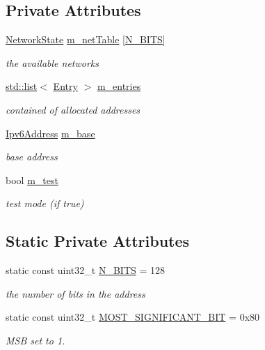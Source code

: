 \subsection*{Private Attributes}
\begin{DoxyCompactItemize}
\item 
\hyperlink{classns3_1_1Ipv6AddressGeneratorImpl_1_1NetworkState}{Network\+State} \hyperlink{classns3_1_1Ipv6AddressGeneratorImpl_a4b742848bb716936009880a429664323}{m\+\_\+net\+Table} \mbox{[}\hyperlink{classns3_1_1Ipv6AddressGeneratorImpl_abe99ce1055f3a7de9263da1d34ef2629}{N\+\_\+\+B\+I\+TS}\mbox{]}
\begin{DoxyCompactList}\small\item\em the available networks \end{DoxyCompactList}\item 
\hyperlink{openflow-interface_8h_afd9bcfa176617760671b67580f536fa7}{std\+::list}$<$ \hyperlink{classns3_1_1Ipv6AddressGeneratorImpl_1_1Entry}{Entry} $>$ \hyperlink{classns3_1_1Ipv6AddressGeneratorImpl_ab7b8cc4871178edafc571d7a9449fef1}{m\+\_\+entries}
\begin{DoxyCompactList}\small\item\em contained of allocated addresses \end{DoxyCompactList}\item 
\hyperlink{classns3_1_1Ipv6Address}{Ipv6\+Address} \hyperlink{classns3_1_1Ipv6AddressGeneratorImpl_a1e53eb1183330c04ef0a0d81e3a3c21e}{m\+\_\+base}
\begin{DoxyCompactList}\small\item\em base address \end{DoxyCompactList}\item 
bool \hyperlink{classns3_1_1Ipv6AddressGeneratorImpl_a6538e5a709f4060466c5253a0289cdf8}{m\+\_\+test}
\begin{DoxyCompactList}\small\item\em test mode (if true) \end{DoxyCompactList}\end{DoxyCompactItemize}
\subsection*{Static Private Attributes}
\begin{DoxyCompactItemize}
\item 
static const uint32\+\_\+t \hyperlink{classns3_1_1Ipv6AddressGeneratorImpl_abe99ce1055f3a7de9263da1d34ef2629}{N\+\_\+\+B\+I\+TS} = 128
\begin{DoxyCompactList}\small\item\em the number of bits in the address \end{DoxyCompactList}\item 
static const uint32\+\_\+t \hyperlink{classns3_1_1Ipv6AddressGeneratorImpl_a14a3d1c913a0273ff123b95ee8d36a3c}{M\+O\+S\+T\+\_\+\+S\+I\+G\+N\+I\+F\+I\+C\+A\+N\+T\+\_\+\+B\+IT} = 0x80
\begin{DoxyCompactList}\small\item\em M\+SB set to 1. \end{DoxyCompactList}\end{DoxyCompactItemize}


